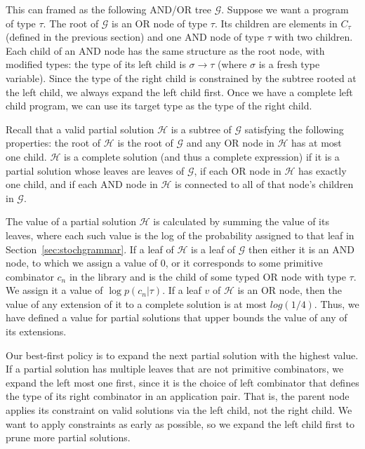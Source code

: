 \documentclass{article}
\begin{document}
This can framed as the following AND/OR tree $\mathcal{G}$. Suppose we
want a program of type $\tau$. The root of $\mathcal{G}$ is an OR node of
type $\tau$. Its children are elements in $C_\tau$ (defined in the previous
section) and one AND node of type $\tau$ with two children. Each child of
an AND node has the same structure as the root node, with modified
types: the type of its left child is $\sigma \rightarrow \tau$ (where $\sigma$ is
a fresh type variable). Since the type of the right child is
constrained by the subtree rooted at the left child, we always expand
the left child first. Once we have a complete left child program, we
can use its target type as the type of the right child.

Recall that a valid partial solution $\mathcal{H}$ is a subtree of
$\mathcal{G}$ satisfying the following properties: the root of
$\mathcal{H}$ is the root of $\mathcal{G}$ and any OR node in
$\mathcal{H}$ has at most one child. $\mathcal{H}$ is a complete
solution (and thus a complete expression) if it is a partial solution
whose leaves are leaves of $\mathcal{G}$, if each OR node in
$\mathcal{H}$ has exactly one child, and if each AND node in
$\mathcal{H}$ is connected to all of that node's children in
$\mathcal{G}$.

The value of a partial solution $\mathcal{H}$ is calculated by summing
the value of its leaves, where each such value is the log of the
probability assigned to that leaf in
Section~\ref{sec:stochgrammar}. If a leaf of $\mathcal{H}$ is a leaf
of $\mathcal{G}$ then either it is an AND node, to which we assign a
value of 0, or it corresponds to some primitive combinator $c_n$ in
the library and is the child of some typed OR node with type $\tau$. We
assign it a value of $\log{p(c_n | \tau)}$. If a leaf $v$ of
$\mathcal{H}$ is an OR node, then the value of any extension of it to
a complete solution is at most $log(1/4)$. Thus, we have defined a
value for partial solutions that upper bounds the value of any of its
extensions.

Our best-first policy is to expand the next partial solution with the
highest value. If a partial solution has multiple leaves that are not
primitive combinators, we expand the left most one first, since it is
the choice of left combinator that defines the type of its right
combinator in an application pair. That is, the parent node applies
its constraint on valid solutions via the left child, not the right
child. We want to apply constraints as early as possible, so we expand
the left child first to prune more partial solutions.
\end{document}
